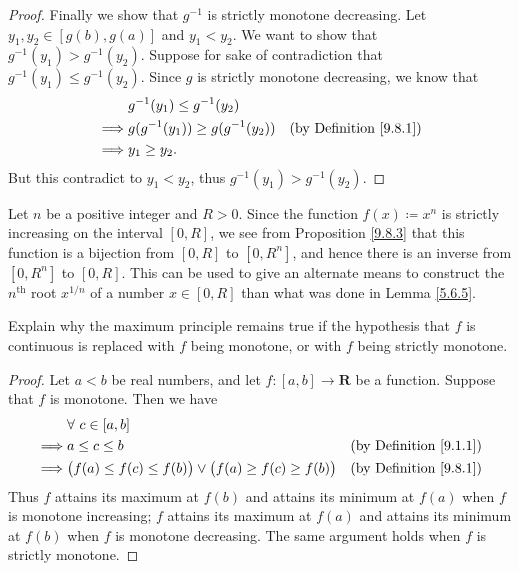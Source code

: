 \begin{proof}
    Finally we show that \(g^{-1}\) is strictly monotone decreasing.
    Let \(y_1, y_2 \in [g(b), g(a)]\) and \(y_1 < y_2\).
    We want to show that \(g^{-1}(y_1) > g^{-1}(y_2)\).
    Suppose for sake of contradiction that \(g^{-1}(y_1) \leq g^{-1}(y_2)\).
    Since \(g\) is strictly monotone decreasing, we know that
    \begin{align*}
                 & g^{-1}(y_1) \leq g^{-1}(y_2)                                            \\
        \implies & g(g^{-1}(y_1)) \geq g(g^{-1}(y_2)) & \text{(by Definition \ref{9.8.1})} \\
        \implies & y_1 \geq y_2.
    \end{align*}
    But this contradict to \(y_1 < y_2\), thus \(g^{-1}(y_1) > g^{-1}(y_2)\).
\end{proof}

\begin{example}\label{9.8.4}
    Let \(n\) be a positive integer and \(R > 0\).
    Since the function \(f(x) \coloneqq x^n\) is strictly increasing on the interval \([0, R]\), we see from Proposition \ref{9.8.3} that this function is a bijection from \([0, R]\) to \([0, R^n]\), and hence there is an inverse from \([0, R^n]\) to \([0, R]\).
    This can be used to give an alternate means to construct the \(n^\text{th}\) root \(x^{1 / n}\) of a number \(x \in [0, R]\) than what was done in Lemma \ref{5.6.5}.
\end{example}

\exercisesection

\begin{exercise}\label{ex 9.8.1}
    Explain why the maximum principle remains true if the hypothesis that \(f\) is continuous is replaced with \(f\) being monotone, or with \(f\) being strictly monotone.
\end{exercise}

\begin{proof}
    Let \(a < b\) be real numbers, and let \(f : [a, b] \to \mathbf{R}\) be a function.
    Suppose that \(f\) is monotone.
    Then we have
    \begin{align*}
                 & \forall\ c \in [a, b]                                                                                           \\
        \implies & a \leq c \leq b                                                            & \text{(by Definition \ref{9.1.1})} \\
        \implies & \big(f(a) \leq f(c) \leq f(b)\big) \lor \big(f(a) \geq f(c) \geq f(b)\big) & \text{(by Definition \ref{9.8.1})} \\
    \end{align*}
    Thus \(f\) attains its maximum at \(f(b)\) and attains its minimum at \(f(a)\) when \(f\) is monotone increasing;
    \(f\) attains its maximum at \(f(a)\) and attains its minimum at \(f(b)\) when \(f\) is monotone decreasing.
    The same argument holds when \(f\) is strictly monotone.
\end{proof}

